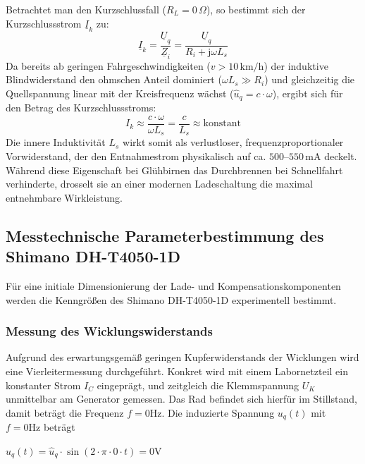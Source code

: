 \documentclass[12pt,a4paper]{article}
\begin{document}
Betrachtet man den Kurzschlussfall ($R_L = 0\,\Omega$), so bestimmt sich der Kurzschlussstrom $\underline{I}_k$ zu:
\begin{equation}
    \underline{I}_k = \frac{\underline{U}_q}{\underline{Z}_i} = \frac{\underline{U}_q}{R_i + \mathrm{j}\omega L_s}
\end{equation}
Da bereits ab geringen Fahrgeschwindigkeiten ($v > 10\,\text{km/h}$) der induktive Blindwiderstand den ohmschen Anteil dominiert 
($\omega L_s \gg R_i$) und gleichzeitig die Quellspannung linear mit der Kreisfrequenz wächst ($\hat{u}_q = c \cdot \omega$), 
ergibt sich für den Betrag des Kurzschlussstroms:
\begin{equation}
    I_k \approx \frac{c \cdot \omega}{\omega L_s} = \frac{c}{L_s} \approx \text{konstant}
    \label{eq:konstantstrom}
\end{equation}
Die innere Induktivität $L_s$ wirkt somit als verlustloser, frequenzproportionaler Vorwiderstand, der den Entnahmestrom physikalisch 
auf ca. $500\text{--}550\,\text{mA}$ deckelt. Während diese Eigenschaft bei Glühbirnen das Durchbrennen bei Schnellfahrt verhinderte, 
drosselt sie an einer modernen Ladeschaltung die maximal entnehmbare Wirkleistung.

\subsection{Messtechnische Parameterbestimmung des Shimano DH-T4050-1D}
\label{subsec:messung}
Für eine initiale Dimensionierung der Lade- und Kompensationskomponenten werden die Kenngrößen 
des Shimano DH-T4050-1D experimentell bestimmt.

\subsubsection{Messung des Wicklungswiderstands}
Aufgrund des erwartungsgemäß geringen Kupferwiderstands der Wicklungen wird eine Vierleitermessung durchgeführt.
Konkret wird mit einem Labornetzteil ein konstanter Strom $I_C$ eingeprägt, und zeitgleich die Klemmspannung $U_K$ 
unmittelbar am Generator gemessen.
Das Rad befindet sich hierfür im Stillstand, damit beträgt die Frequenz $f=0\text{Hz}$. 
Die induzierte Spannung $u_q(t)$ mit $f=0\text{Hz}$ beträgt 

\begin{center}
    $u_q(t) = \hat{u}_q \cdot \sin(2 \cdot \pi \cdot 0 \cdot t) = 0\text{V}$
\end{center}
\end{document}
